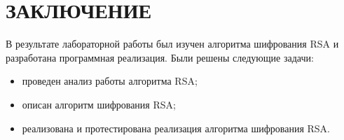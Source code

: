 \chapter*{ЗАКЛЮЧЕНИЕ}

В результате лабораторной работы был изучен алгоритма шифрования RSA и разработана программная реализация. Были решены следующие задачи:

\begin{itemize}[label=---]
	\item проведен анализ работы алгоритма RSA;
	\item описан алгоритм шифрования RSA;
    \item реализована и протестирована реализация алгоритма шифрования RSA.
\end{itemize}
